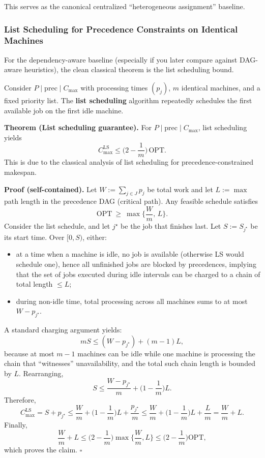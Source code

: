 This serves as the canonical centralized ``heterogeneous assignment'' baseline.

\subsubsection{List Scheduling for Precedence Constraints on Identical Machines}

For the dependency-aware baseline (especially if you later compare against DAG-aware heuristics), the clean classical theorem is the list scheduling bound.

Consider \(P\mid \mathrm{prec}\mid C_{\max}\) with processing times \((p_j)\), \(m\) identical machines, and a fixed priority list. The \textbf{list scheduling} algorithm repeatedly schedules the first available job on the first idle machine.

\textbf{Theorem (List scheduling guarantee).} For \(P\mid \mathrm{prec}\mid C_{\max}\), list scheduling yields
\[
C_{\max}^{\mathrm{LS}} \le \Big(2-\frac{1}{m}\Big)\, \mathrm{OPT}.
\]
This is due to the classical analysis of list scheduling for precedence-constrained makespan.

\textbf{Proof (self-contained).} Let \(W:=\sum_{j\in J} p_j\) be total work and let \(L:=\max\) path length in the precedence DAG (critical path). Any feasible schedule satisfies
\[
\mathrm{OPT}\ \ge\ \max\Big\{\frac{W}{m},\, L\Big\}.
\]
Consider the list schedule, and let \(j^\star\) be the job that finishes last. Let \(S:=S_{j^\star}\) be its start time. Over \([0,S)\), either:
\begin{itemize}
\item at a time when a machine is idle, no job is available (otherwise LS would schedule one), hence all unfinished jobs are blocked by precedences, implying that the set of jobs executed during idle intervals can be charged to a chain of total length \(\le L\);
\item during non-idle time, total processing across all machines sums to at most \(W - p_{j^\star}\).
\end{itemize}

A standard charging argument yields:
\[
mS \le (W - p_{j^\star}) + (m-1)L,
\]
because at most \(m-1\) machines can be idle while one machine is processing the chain that ``witnesses'' unavailability, and the total such chain length is bounded by \(L\). Rearranging,
\[
S \le \frac{W-p_{j^\star}}{m} + \Big(1-\frac{1}{m}\Big)L.
\]
Therefore,
\[
C_{\max}^{\mathrm{LS}} = S + p_{j^\star}
\le \frac{W}{m} + \Big(1-\frac{1}{m}\Big)L + \frac{p_{j^\star}}{m}
\le \frac{W}{m} + \Big(1-\frac{1}{m}\Big)L + \frac{L}{m}
= \frac{W}{m} + L.
\]
Finally,
\[
\frac{W}{m} + L \le \Big(2-\frac1m\Big)\max\Big\{\frac{W}{m}, L\Big\}
\le \Big(2-\frac1m\Big)\mathrm{OPT},
\]
which proves the claim. \(\square\)

